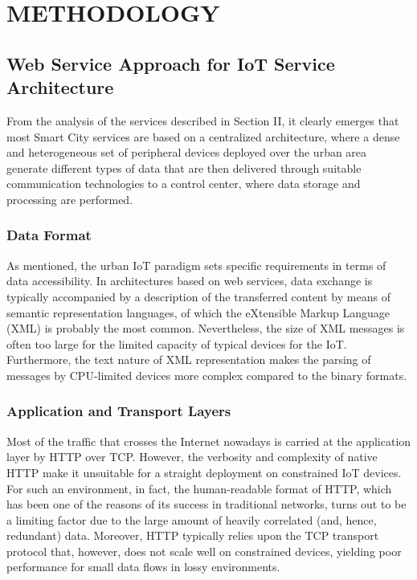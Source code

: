\documentclass[conference,column]{IEEEtran}
\begin{document}
\section{METHODOLOGY}

\subsection{Web Service Approach for IoT Service Architecture}
From the analysis of the services described in Section II, it clearly emerges that most Smart City services are based on a centralized architecture, where a dense and heterogeneous set of peripheral devices deployed over the urban area generate different types of data that are then delivered through suitable communication
technologies to a control center, where data storage
and processing are performed.

\subsubsection{Data Format}  As mentioned, the urban IoT paradigm sets specific requirements in terms of data accessibility. In architectures based on web services, data exchange is typically accompanied by a description of the transferred content by means of semantic representation languages, of which the eXtensible Markup Language (XML) is probably the most common. Nevertheless, the size of XML messages is often
too large for the limited capacity of typical devices for the IoT. Furthermore, the text nature of XML representation makes the parsing of messages by CPU-limited devices more complex compared to the binary formats.

\subsubsection{ Application and Transport Layers} Most of the traffic that crosses the Internet nowadays is carried at the application layer by HTTP over TCP. However, the verbosity and complexity of native HTTP make it unsuitable for a straight deployment on constrained IoT devices. For such an environment, in fact, the
human-readable format of HTTP, which has been one of the reasons of its success in traditional networks, turns out to be a limiting factor due to the large amount of heavily correlated (and, hence, redundant) data. Moreover, HTTP typically relies upon the TCP transport protocol that, however, does not scale well on constrained devices, yielding poor performance for small data flows in lossy environments.
\end{document}
